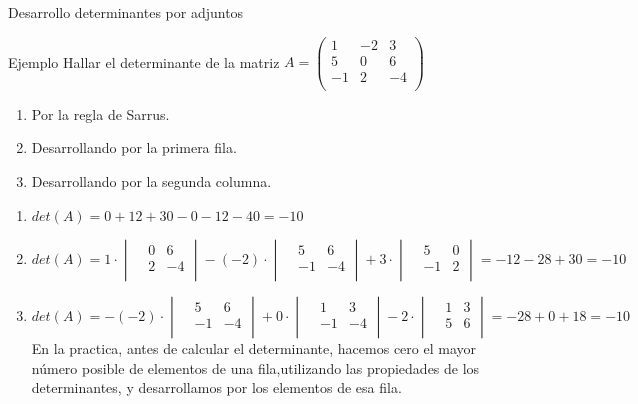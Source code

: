 \documentclass[9pt]{beamer}
\begin{document}
\begin{frame}{Desarrollo determinantes por adjuntos}
\begin{exampleblock}{Ejemplo}
Hallar el determinante de la matriz $A=\begin{pmatrix} 
 1& -2& 3 \\
 5& 0& 6 \\
 -1& 2& -4 \\
\end{pmatrix} $
\begin{enumerate}
\item Por la regla de Sarrus.
\item Desarrollando por la primera fila.
\item Desarrollando por la segunda columna.
\end{enumerate}
\end{exampleblock}
\pause
\begin{enumerate}[<+-|alert@+>]
\item $det(A)= 0+12+30-0-12-40=-10$
\item $det(A)=1\cdot \begin{vmatrix}& 0& 6 \\& 2& -4 \\ \end{vmatrix} -(-2)\cdot \begin{vmatrix}& 5& 6 \\& -1& -4 \\ \end{vmatrix} +3\cdot \begin{vmatrix}& 5& 0 \\& -1& 2 \\ \end{vmatrix}= -12-28+30=-10$
\item $det(A)=-(-2)\cdot \begin{vmatrix}& 5& 6 \\& -1& -4 \\ \end{vmatrix} +0\cdot \begin{vmatrix}& 1& 3 \\& -1& -4 \\ \end{vmatrix} -2\cdot \begin{vmatrix}& 1& 3 \\& 5& 6 \\ \end{vmatrix}= -28+0+18=-10$
\pause
En la practica, antes de calcular el determinante, hacemos cero el mayor número posible de elementos de una fila,utilizando las propiedades de los determinantes, y desarrollamos por los elementos de esa fila.

\end{enumerate}
\end{frame}
\end{document}
